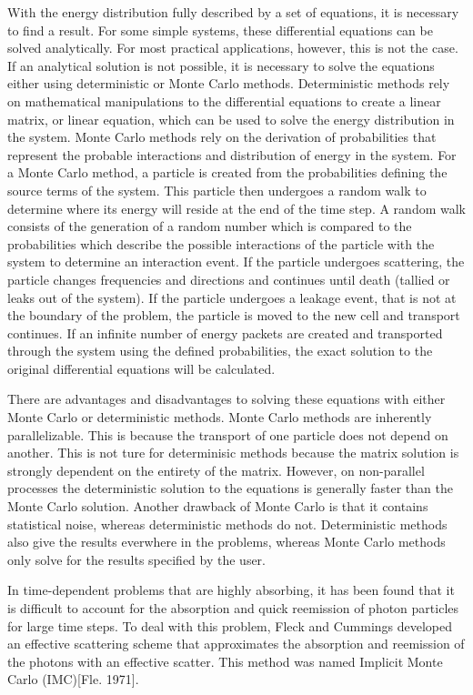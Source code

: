 	With the energy distribution fully described by a set of equations, it is necessary to find a result. For some simple systems, these differential equations can be solved analytically. For most practical applications, however, this is not the case. If an analytical solution is not possible, it is necessary to solve the equations either using deterministic or Monte Carlo methods. Deterministic methods rely on mathematical manipulations to the differential equations to create a linear matrix, or linear equation, which can be used to solve the energy distribution in the system. Monte Carlo methods rely on the derivation of probabilities that represent the probable interactions and distribution of energy in the system. For a Monte Carlo method, a particle is created from the probabilities defining the source terms of the system. This particle then undergoes a random walk to determine where its energy will reside at the end of the time step. A random walk consists of the generation of a random number which is compared to the probabilities which describe the possible interactions of the particle with the system to determine an interaction event. If the particle undergoes scattering, the particle changes frequencies and directions and continues until death (tallied or leaks out of the system). If the particle undergoes a leakage event, that is not at the boundary of the problem, the particle is moved to the new cell and transport continues. If an infinite number of energy packets are created and transported through the system using the defined probabilities, the exact solution to the original differential equations will be calculated.

	There are advantages and disadvantages to solving these equations with either Monte Carlo or deterministic methods. Monte Carlo methods are inherently parallelizable. This is because the transport of one particle does not depend on another. This is not ture for determinisic methods because the matrix solution is strongly dependent on the entirety of the matrix. However, on non-parallel processes the deterministic solution to the equations is generally faster than the Monte Carlo solution. Another drawback of Monte Carlo is that it contains statistical noise, whereas deterministic methods do not. Deterministic methods also give the results everwhere in the problems, whereas Monte Carlo methods only solve for the results specified by the user.

	In time-dependent problems that are highly absorbing, it has been found that it is difficult to account for the absorption and quick reemission of photon particles for large time steps. To deal with this problem, Fleck and Cummings developed an effective scattering scheme that approximates the absorption and reemission of the photons with an effective scatter. This method was named Implicit Monte Carlo (IMC)[Fle. 1971].

